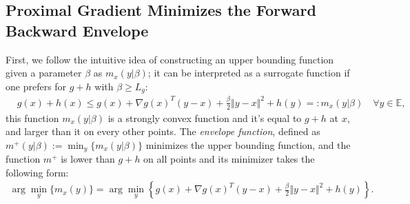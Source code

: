 \documentclass[]{article}
\theoremstyle{definition}
\begin{document}
    \subsection{Proximal Gradient Minimizes the Forward Backward Envelope}
        First, we follow the intuitive idea of constructing an upper bounding function given a parameter $\beta$ as  $m_x(y|\beta)$; it can be interpreted as a surrogate function if one prefers for $g + h$ with $\beta \ge L_g$: 
        \begin{align*}
            & g(x) + h(x) \le 
            g(x) + \nabla g(x)^T(y - x) + \frac{\beta}{2} \Vert y - x\Vert^2
            + h(y) =: m_x(y|\beta) \quad \forall y \in \mathbb E, 
        \end{align*}
        this function $m_x(y|\beta)$ is a strongly convex function and it's equal to $g + h$ at $x$, and larger than it on every other points. The \emph{envelope function}, defined as $m^+(y|\beta):= \min_y \{m_x(y|\beta)\}$ minimizes the upper bounding function, and the function $m^+$ is lower than $g + h$ on all points and its minimizer takes the following form: 
        \begin{align*}
            \arg\min_{y} \{m_x(y)\} 
            = \arg\min_{y}\left\lbrace
                g(x) + \nabla g(x)^T(y - x) + \frac{\beta}{2}
                \Vert y - x\Vert^2 + h(y) 
            \right\rbrace. 
        \end{align*}
        
\end{document}
